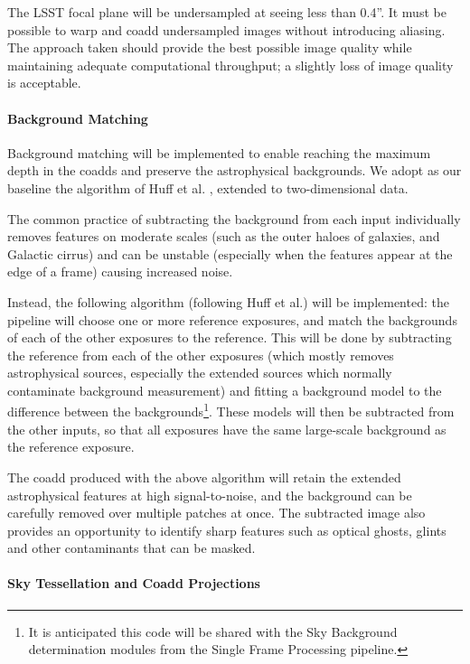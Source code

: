\documentclass[12pt]{article}
\begin{document}
The LSST focal plane will be undersampled at seeing less than 0.4''. It must be possible to warp and coadd undersampled images without introducing aliasing. The approach taken should provide the best possible image quality while maintaining adequate computational throughput; a slightly loss of image quality is acceptable.

\paragraph{Background Matching}
\label{alg:backgroundMatching}

Background matching will be implemented to enable reaching the maximum depth in the coadds and preserve the astrophysical backgrounds.  We adopt as our baseline the algorithm of Huff et al. \cite{Huff11}, extended to two-dimensional data.

The common practice of subtracting the background from each input individually removes features on moderate scales (such as the outer haloes of galaxies, and Galactic cirrus) and can be unstable (especially when the features appear at the edge of a frame) causing increased noise.

Instead, the following algorithm (following Huff et al.) will be implemented: the pipeline will choose one or more reference exposures, and match the backgrounds of each of the other exposures to the reference.  This will be done by subtracting the reference from each of the other exposures (which mostly removes astrophysical sources, especially the extended sources which normally contaminate background measurement) and fitting a background model to the difference between the backgrounds\footnote{It is anticipated this code will be shared with the Sky Background determination modules from the Single Frame Processing pipeline.}. These models will then be subtracted from the other inputs, so that all exposures have the same large-scale background as the reference exposure. 

The coadd produced with the above algorithm will retain the extended astrophysical features at high signal-to-noise, and the background can be carefully removed over multiple patches at once. The subtracted image also provides an opportunity to identify sharp features such as optical ghosts, glints and other contaminants that can be masked.

\paragraph{Sky Tessellation and Coadd Projections\label{alg:skymap}}
\end{document}
